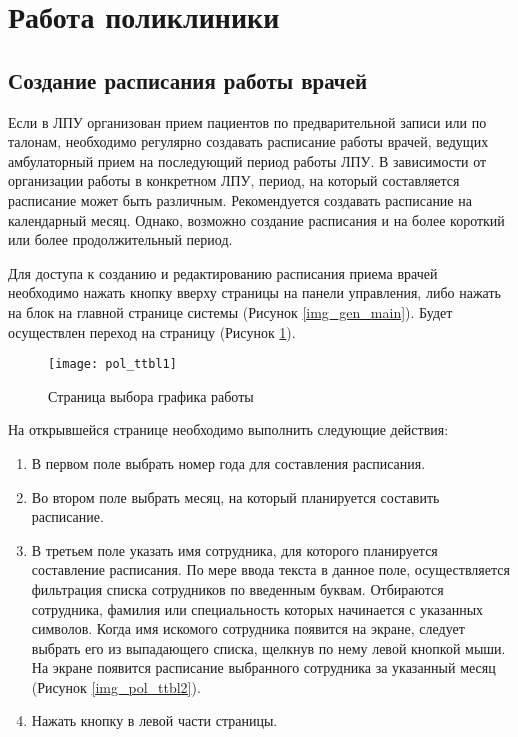 \newpage
\section{Работа поликлиники}

\subsection{Создание расписания работы врачей}

Если в ЛПУ организован прием пациентов по предварительной записи или по талонам, необходимо регулярно создавать расписание работы врачей, ведущих амбулаторный прием на последующий период работы ЛПУ. В зависимости от организации работы в конкретном ЛПУ, период, на который составляется расписание может быть различным. Рекомендуется создавать расписание на календарный месяц. Однако, возможно создание расписания и на более короткий или более продолжительный период.

Для доступа к созданию и редактированию расписания приема врачей необходимо нажать кнопку  вверху страницы на панели управления, либо нажать на блок  на главной странице системы (Рисунок \ref{img_gen_main}). Будет осуществлен переход на страницу  (Рисунок \ref{img_pol_ttbl1}).

\begin{figure}[ht]\centering
 \texttt{[image: pol\_ttbl1]}
 \caption{Страница выбора графика работы}
 \label{img_pol_ttbl1}
\end{figure}

На открывшейся странице необходимо выполнить следующие действия:
\begin{enumerate}
 \item В первом поле выбрать номер года для составления расписания.
 \item Во втором поле выбрать месяц, на который планируется составить расписание.
 \item В третьем поле указать имя сотрудника, для которого планируется составление расписания. По мере ввода текста в данное поле, осуществляется фильтрация списка сотрудников по введенным буквам. Отбираются сотрудника, фамилия или специальность которых начинается с указанных символов. Когда имя искомого сотрудника появится на экране, следует выбрать его из выпадающего списка, щелкнув по нему левой кнопкой мыши. На экране появится расписание выбранного сотрудника за указанный месяц (Рисунок \ref{img_pol_ttbl2}). 
 \item Нажать кнопку  в левой части страницы. 
\end{enumerate}


